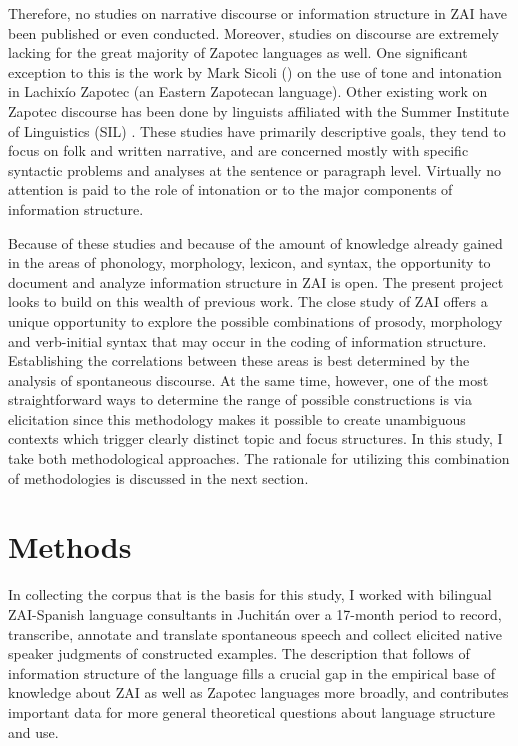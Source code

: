 Therefore, no studies on narrative discourse or information structure in ZAI have been published or even conducted. Moreover, studies on discourse are extremely lacking for the great majority of Zapotec languages as well. One significant exception to this is the work by Mark Sicoli (\citealt{sicoli2007,sicoli2010}) on the use of tone and intonation in Lachix\'{i}o Zapotec (an Eastern Zapotecan language). Other existing work on Zapotec discourse has been done by linguists affiliated with the Summer Institute of Linguistics (SIL)  \citep{persons1979,long1985,benton1987,benton1997,kreikebaum1987,riggs1987,ward1987,piper1995,heise2003,riggs2010}. These studies have primarily descriptive goals, they tend to focus on folk and written narrative, and are concerned mostly with specific syntactic problems and analyses at the sentence or paragraph level. Virtually no attention is paid to the role of intonation or to the major components of information structure.

Because of these studies and because of the amount of knowledge already gained in the areas of phonology, morphology, lexicon, and syntax, the opportunity to document and analyze information structure in ZAI is open. The present project looks to build on this wealth of previous work. The close study of ZAI offers a unique opportunity to explore the possible combinations of prosody, morphology and verb-initial syntax that may occur in the coding of information structure. Establishing the correlations between these areas is best determined by the analysis of spontaneous discourse. At the same time, however, one of the most straightforward ways to determine the range of possible constructions is via elicitation since this methodology makes it possible to create unambiguous contexts which trigger clearly distinct topic and focus structures. In this study, I take both methodological approaches. The rationale for utilizing this combination of methodologies is discussed in the next section.


\section{Methods}

In collecting the corpus that is the basis for this study, I worked with bilingual ZAI-Spanish language consultants in Juchit\'{an} over a 17-month period to record, transcribe, annotate and translate spontaneous speech and collect elicited native speaker judgments of constructed examples. The description that follows of information structure of the language fills a crucial gap in the empirical base of knowledge about ZAI as well as Zapotec languages more broadly, and contributes important data for more general theoretical questions about language structure and use.

